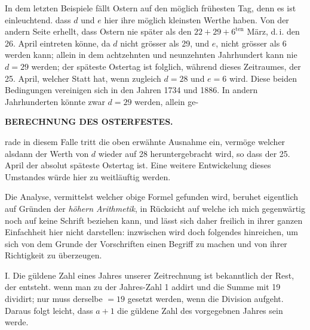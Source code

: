 In dem letzten Beispiele fällt Ostern auf den möglich frühesten Tag, denn
es ist einleuchtend. dass $d$ und $e$ hier ihre möglich kleinsten Werthe haben.
Von der andern Seite erhellt, dass Ostern nie später als den $22+29+6^{\mathrm{ten}}$ März,
d.\,i. den 26. April eintreten könne, da $d$ nicht grösser als 29, und $e$, nicht
grösser als 6 werden kann; allein in dem achtzehnten und neunzehnten Jahrhundert
kann nie $d=29$ werden; der späteste Ostertag ist folglich, während
dieses Zeitraumes, der 25. April, welcher Statt hat, wenn zugleich $d=28$ und
$e=6$ wird. Diese beiden Bedingungen vereinigen sich in den Jahren 1734
und 1886. In andern Jahrhunderten könnte zwar $d=29$ werden, allein ge-\par
\clearpage
\thispagestyle{empty}
\noindent{}%
\makebox[12mm][l]{}%
\parbox[t]{\dimexpr\linewidth-24mm\relax}{\centering\footnotesize\bfseries BERECHNUNG DES OSTERFESTES.\par}%
\par\nobreak\medskip
\noindent rade in diesem Falle tritt die oben erwähnte Ausnahme ein, vermöge welcher alsdann
der Werth von $d$ wieder auf 28 heruntergebracht wird, so dass der 25.
April der absolut späteste Ostertag ist. Eine weitere Entwickelung dieses Umstandes
würde hier zu weitläuftig werden.

Die Analyse, vermittelst welcher obige Formel gefunden wird, beruhet eigentlich
auf Gründen der \textit{höhern Arithmetik}, in Rücksicht auf welche ich mich
gegenwärtig noch auf keine Schrift beziehen kann, und lässt sich daher freilich
in ihrer ganzen Einfachheit hier nicht darstellen: inzwischen wird doch folgendes
hinreichen, um sich von dem Grunde der Vorschriften einen Begriff zu machen
und von ihrer Richtigkeit zu überzeugen.

I. Die güldene Zahl eines Jahres unserer Zeitrechnung ist bekanntlich der
Rest, der entsteht. wenn man zu der Jahres-Zahl 1 addirt und die Summe mit 19
dividirt; nur muss derselbe $=19$ gesetzt werden, wenn die Division aufgeht.
Daraus folgt leicht, dass $a+1$ die güldene Zahl des vorgegebnen Jahres sein werde.

